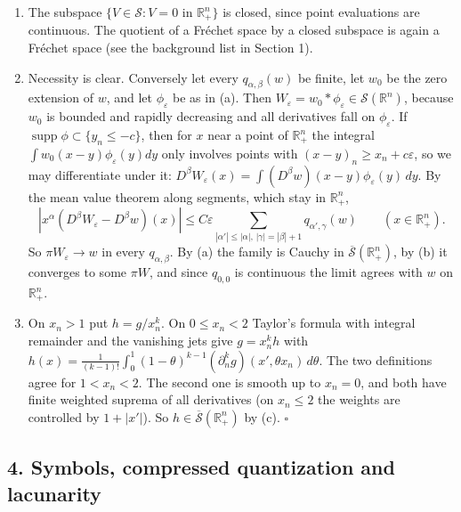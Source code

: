 \documentclass[
  11pt,
]{article}
\begin{document}
\begin{enumerate}
\def\labelenumi{(\alph{enumi})}
\setcounter{enumi}{1}
\item
  The subspace \(\{V\in\mathcal S:V=0\text{ in }\mathbb R^n_+\}\) is
  closed, since point evaluations are continuous. The quotient of a
  Fréchet space by a closed subspace is again a Fréchet space (see the
  background list in Section 1).
\item
  Necessity is clear. Conversely let every \(q_{\alpha,\beta}(w)\) be
  finite, let \(w_0\) be the zero extension of \(w\), and let
  \(\phi_\varepsilon\) be as in (a). Then
  \(W_\varepsilon=w_0*\phi_\varepsilon\in\mathcal S(\mathbb R^n)\),
  because \(w_0\) is bounded and rapidly decreasing and all derivatives
  fall on \(\phi_\varepsilon\). If
  \(\operatorname{supp}\phi\subset\{y_n\leq-c\}\), then for \(x\) near a
  point of \(\mathbb R^n_+\) the integral
  \(\int w_0(x-y)\phi_\varepsilon(y)dy\) only involves points with
  \((x-y)_n\geq x_n+c\varepsilon\), so we may differentiate under it:
  \(D^\beta W_\varepsilon(x)=\int(D^\beta w)(x-y)\phi_\varepsilon(y)\,dy\).
  By the mean value theorem along segments, which stay in
  \(\mathbb R^n_+\), \[
|x^\alpha(D^\beta W_\varepsilon-D^\beta w)(x)|\leq C\varepsilon\sum_{|\alpha'|\leq|\alpha|,\,|\gamma|=|\beta|+1}q_{\alpha',\gamma}(w)\qquad(x\in\mathbb R^n_+).
\] So \(\pi W_\varepsilon\to w\) in every \(q_{\alpha,\beta}\). By (a)
  the family is Cauchy in \(\overline{\mathcal S}(\mathbb R^n_+)\), by
  (b) it converges to some \(\pi W\), and since \(q_{0,0}\) is
  continuous the limit agrees with \(w\) on \(\mathbb R^n_+\).
\item
  On \(x_n>1\) put \(h=g/x_n^k\). On \(0\leq x_n<2\) Taylor's formula
  with integral remainder and the vanishing jets give \(g=x_n^kh\) with
  \(h(x)=\frac1{(k-1)!}\int_0^1(1-\theta)^{k-1}(\partial_n^kg)(x',\theta x_n)\,d\theta\).
  The two definitions agree for \(1<x_n<2\). The second one is smooth up
  to \(x_n=0\), and both have finite weighted suprema of all derivatives
  (on \(x_n\leq2\) the weights are controlled by \(1+|x'|\)). So
  \(h\in\overline{\mathcal S}(\mathbb R^n_+)\) by (c). \(\square\)
\end{enumerate}

\subsection{4. Symbols, compressed quantization and
lacunarity}\label{symbols-compressed-quantization-and-lacunarity}
\end{document}
